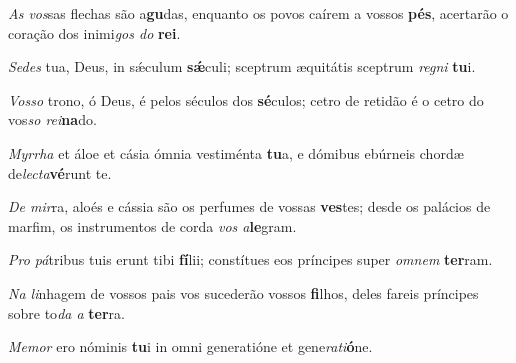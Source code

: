 \begin{greenumerate}
  \switchcolumn%

  \item \textit{As vos}sas flechas são a\textbf{gu}das, {\GreDagger} enquanto os povos caírem a vossos \textbf{pés},{\GreStar} acertarão o coração dos inimi\textit{gos do} \textbf{rei}. 

  \switchcolumn*


  \item \textit{Sedes} tua, Deus, in sǽculum \textbf{sǽ}culi; {\GreStar} sceptrum æquitátis sceptrum \textit{regni} \textbf{tu}i. 

  \switchcolumn%

  \item \textit{Vosso} trono, ó Deus, é pelos séculos dos \textbf{sé}culos; {\GreStar} cetro de retidão é o cetro do vos\textit{so rei}\textbf{na}do. 

  \switchcolumn*


  \item \textit{Myrrha} et áloe et cásia ómnia vestiménta \textbf{tu}a, {\GreStar} e dómibus ebúrneis chordæ de\textit{lecta}\textbf{vé}runt te. 

  \switchcolumn%

  \item \textit{De mir}ra, aloés e cássia são os perfumes de vossas \textbf{ves}tes; {\GreStar} desde os palácios de marfim, os instrumentos de corda \textit{vos a}\textbf{le}gram. 

  \switchcolumn*


  \item \textit{Pro pá}tribus tuis erunt tibi \textbf{fí}lii; {\GreStar} constítues eos príncipes super \textit{omnem} \textbf{ter}ram. 

  \switchcolumn%

  \item \textit{Na li}nhagem de vossos pais vos sucederão vossos \textbf{fi}\-lhos, {\GreStar} deles fareis príncipes sobre to\textit{da a} \textbf{ter}ra. 

  \switchcolumn*


  \item \textit{Memor} ero nóminis \textbf{tu}i {\GreStar} in omni generatióne et gene\textit{rati}\textbf{ó}ne. 


\end{greenumerate}
